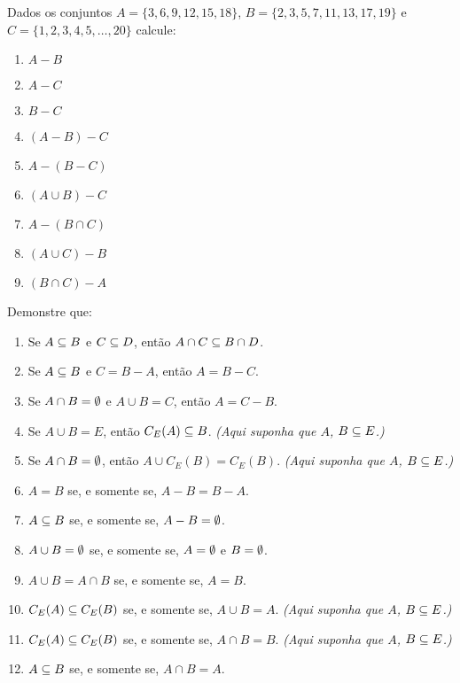 \documentclass[12pt]{exam}
\begin{document}
\vspace{.3cm}

\questao Dados os conjuntos $A = \{3,6,9,12,15,18\}$, $B = \{2,3,5,7,11,13,17,19\}$ e $C = \{1,2,3,4,5,\dots,20\}$ calcule:
\begin{multicols}{3}
	\begin{enumerate}[label={\alph*})]
		\item $A - B$
		\item $A - C$
		\item $B - C$
		\item $(A - B) - C$
		\item $A - (B - C)$
		\item $(A \cup B) - C$
		\item $A - (B \cap C)$
		\item $(A \cup C) - B$
		\item $(B \cap C) - A$
	\end{enumerate}
\end{multicols}

\vspace{.3cm}

\questao Demonstre que:
\begin{enumerate}[label={\alph*})]
\item Se $A \subseteq B$ e $C \subseteq D$, ent\~ao $A \cap C \subseteq B \cap D$.

\item Se $A \subseteq B$ e $C = B - A$, ent\~ao $A = B - C$.

\item Se $A \cap B = \emptyset$ e $A \cup B = C$, ent\~ao $A = C - B$.

\item Se $A\cup B = E$, ent\~ao $C_E(A) \subseteq B$. \textit{(Aqui suponha que $A$, $B \subseteq E$.)}

\item Se $A \cap B = \emptyset$, ent\~ao $A \cup C_E(B) = C_E(B)$. \textit{(Aqui suponha que $A$, $B \subseteq E$.)}
  
\item $A = B$ se, e somente se, $A - B = B - A$.

\item $A \subseteq B$ se, e somente se, $A - B = \emptyset$.

\item $A \cup B = \emptyset$ se, e somente se, $A = \emptyset$ e $B = \emptyset$.

\item $A \cup B = A \cap B$ se, e somente se,  $A = B$.

\item $C_E(A) \subseteq C_E(B)$ se, e somente se, $A \cup B = A$. \textit{(Aqui suponha que $A$, $B \subseteq E$.)}

\item $C_E(A) \subseteq C_E(B)$ se, e somente se, $A \cap B = B$. \textit{(Aqui suponha que $A$, $B \subseteq E$.)}

\item $A \subseteq B$ se, e somente se,  $A \cap B = A$.
\end{enumerate}
\end{document}
